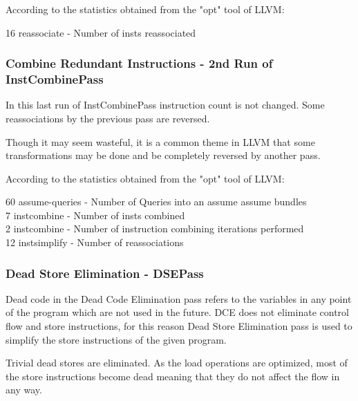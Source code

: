 According to the statistics obtained from the "opt" tool of LLVM:
\begin{displayquote}
    16 reassociate - Number of insts reassociated
\end{displayquote}


\subsubsection{Combine Redundant Instructions - 2nd Run of InstCombinePass}
In this last run of InstCombinePass instruction count is not changed. Some reassociations by the previous pass are reversed.





Though it may seem wasteful, it is a common theme in LLVM that some transformations may be done and be completely reversed by another pass. 


According to the statistics obtained from the "opt" tool of LLVM:
\begin{displayquote}
60 assume-queries - Number of Queries into an assume assume bundles \\
 7 instcombine    - Number of insts combined \\
 2 instcombine    - Number of instruction combining iterations performed \\
12 instsimplify   - Number of reassociations \\
\end{displayquote}


\subsubsection{Dead Store Elimination - DSEPass}
Dead code in the Dead Code Elimination pass refers to the variables in any point of the program which are not used in the future. DCE does not eliminate control flow and store instructions, for this reason Dead Store Elimination pass is used to simplify the store instructions of the given program.

Trivial dead stores are eliminated. As the load operations are optimized, most of the store instructions become dead meaning that they do not affect the flow in any way.


